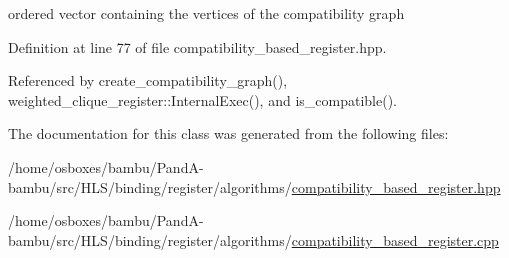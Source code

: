 ordered vector containing the vertices of the compatibility graph 



Definition at line 77 of file compatibility\+\_\+based\+\_\+register.\+hpp.



Referenced by create\+\_\+compatibility\+\_\+graph(), weighted\+\_\+clique\+\_\+register\+::\+Internal\+Exec(), and is\+\_\+compatible().



The documentation for this class was generated from the following files\+:\begin{DoxyCompactItemize}
\item 
/home/osboxes/bambu/\+Pand\+A-\/bambu/src/\+H\+L\+S/binding/register/algorithms/\hyperlink{compatibility__based__register_8hpp}{compatibility\+\_\+based\+\_\+register.\+hpp}\item 
/home/osboxes/bambu/\+Pand\+A-\/bambu/src/\+H\+L\+S/binding/register/algorithms/\hyperlink{compatibility__based__register_8cpp}{compatibility\+\_\+based\+\_\+register.\+cpp}\end{DoxyCompactItemize}
